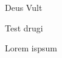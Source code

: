 \documentclass{article}
\author{KondziuK}
\date{\today}
\begin{document}
Deus Vult

Test drugi

Lorem ispsum
\end{document}
